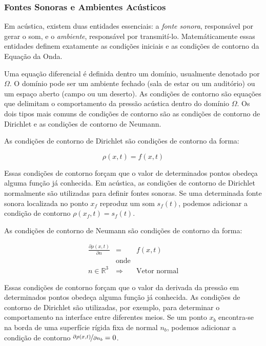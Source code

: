 \subsubsection{Fontes Sonoras e Ambientes Acústicos}

Em acústica, existem duas entidades essenciais: a \emph{fonte sonora}, responsável por gerar o som, e o \emph{ambiente}, responsável por transmití-lo. Matemáticamente essas entidades definem exatamente as condições iniciais e as condições de contorno da Equação da Onda.

Uma equação diferencial é definida dentro um domínio, usualmente denotado por $\Omega$. O domínio pode ser um ambiente fechado (sala de estar ou um auditório) ou um espaço aberto (campo ou um deserto). As condições de contorno são equações que delimitam o comportamento da pressão acústica dentro do domínio $\Omega$. Os dois tipos mais comuns de condições de contorno são as condições de contorno de Dirichlet e as condições de contorno de Neumann.

As condições de contorno de Dirichlet são condições de contorno da forma:

\begin{equation}
	\rho(x, t) = f(x, t)
\end{equation}

Essas condições de contorno forçam que o valor de determinados pontos obedeça alguma função já conhecida. Em acústica, as condições de contorno de Dirichlet normalmente são utilizadas para definir fontes sonoras. Se uma determinada fonte sonora localizada no ponto $x_{f}$ reproduz um som $s_f(t)$, podemos adicionar a condição de contorno $\rho(x_{f}, t) = s_f(t)$.

As condições de contorno de Neumann são condições de contorno da forma:

\begin{eqnarray}
\frac{\partial\rho(x, t)}{\partial n} &=& f(x, t)\\
&\text{onde}& \nonumber \\
n \in \mathbb{R}^3 &\Rightarrow& \text{Vetor normal}\nonumber 
\end{eqnarray}

Essas condições de contorno forçam que o valor da derivada da pressão em determinados pontos obedeça alguma função já conhecida. As condições de contorno de Dirichlet são utilizadas, por exemplo, para determinar o comportamento na interface entre diferentes meios. Se um ponto $x_{b}$ encontra-se na borda de uma superfície rígida fixa de normal $n_b$, podemos adicionar a condição de contorno $\nicefrac{\partial\rho(x, t)}{\partial n_b} = 0$.

